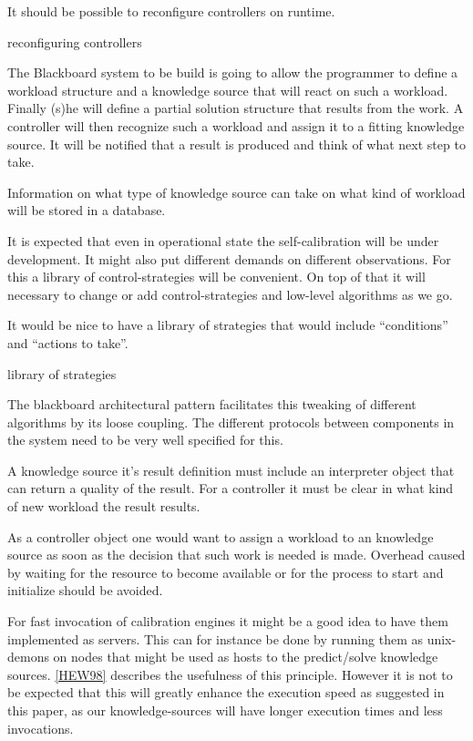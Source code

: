 \documentclass[]{lofar}
\begin{document}
    \begin{requirement}
      It should be possible to reconfigure controllers on runtime.
      \caption{reconfiguring controllers\label{req:reconfigure-controllers}}
    \end{requirement}

    The Blackboard system to be build is going to allow the programmer
    to define a workload structure and a knowledge source that will
    react on such a workload. Finally (s)he will define a partial
    solution structure that results from the work. A controller will
    then recognize such a workload and assign it to a fitting
    knowledge source. It will be notified that a result is produced
    and think of what next step to take.

    Information on what type of knowledge source can take on what kind
    of workload will be stored in a database.

    It is expected that even in operational state the self-calibration
    will be under development. It might also put different demands on
    different observations. For this a library of control-strategies
    will be convenient. On top of that it will necessary to change or
    add control-strategies and low-level algorithms as we go.

    \begin{requirement}
      It would be nice to have a library of strategies that would
      include ``conditions'' and ``actions to take''.
      \caption{library of strategies\label{req:strategies}}
    \end{requirement}

    The blackboard architectural pattern facilitates this tweaking of
    different algorithms by its loose coupling. The different
    protocols between components in the system need to be very well
    specified for this.

    A knowledge source it's result definition must include an
    interpreter object that can return a quality of the result. For a
    controller it must be clear in what kind of new workload the
    result results.

    As a controller object one would want to assign a workload to an
    knowledge source as soon as the decision that such work is needed
    is made. Overhead caused by waiting for the resource to become
    available or for the process to start and initialize should be
    avoided.

    For fast invocation of calibration engines it might be a good
    idea to have them implemented as servers. This can for instance be
    done by running them as unix-demons on nodes that might be used as
    hosts to the predict/solve knowledge
    sources. \hyperlink{bib:Efficiency}{[HEW98]} describes the
    usefulness of this principle. However it is not to be expected
    that this will greatly enhance the execution speed as suggested in
    this paper, as our knowledge-sources will have longer execution
    times and less invocations.
\end{document}
